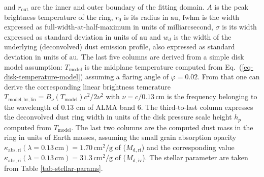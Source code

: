 \documentclass{aa}
\begin{document}
\begin{table*}
{  and $r_{\mathrm{out}}$ are the inner and outer boundary of the fitting domain. $A$ is the
  peak brightness temperature of the ring, $r_0$ is its radius in $\mathrm{au}$,
  $\mathrm{fwhm}$ is the width expressed as full-width-at-half-maximum in units
  of milliarcsecond, $\sigma$ is its width expressed as standard deviation in
  units of $\mathrm{au}$ and $w_d$ is the width of the underlying (deconvolved)
  dust emission profile, also expressed as standard deviation in units of
  $\mathrm{au}$. The last five columns are derived from a simple disk model
  assumption: $T_{\mathrm{model}}$ is the midplane temperature computed from
  Eq.~(\ref{eq-disk-temperature-model}) assuming a flaring angle of
  $\varphi=0.02$. From that one can derive the corresponding linear brightness
  temerature $T_{\mathrm{model,br,lin}}=B_\nu(T_{\mathrm{model}})c^2/2\nu^2$ with
  $\nu=c/0.13\,\mathrm{cm}$ is the frequency belonging to the wavelength of
  0.13 $\mathrm{cm}$ of ALMA band 6.
  The third-to-last column expresses the deconvolved dust ring
  width in units of the disk pressure scale height $h_p$ computed from
  $T_{\mathrm{model}}$. The last two columns are the computed dust mass in the
  ring in units of Earth masses, assuming the small grain absorption opacity
  $\kappa_{\mathrm{abs,ri}}(\lambda=0.13\,\mathrm{cm})=1.70\,\mathrm{cm}^2/\mathrm{g}$
  of \citet{2010A&A...512A..15R} ($M_{\mathrm{d,ri}}$) and the corresponding
  value
  $\kappa_{\mathrm{abs,ri}}(\lambda=0.13\,\mathrm{cm})=31.3\,\mathrm{cm}^2/\mathrm{g}$
  of \citet{1997MNRAS.291..121I} ($M_{\mathrm{d,iv}}$). The stellar parameter
  are taken from Table \ref{tab-stellar-params}.}
\end{table*}
\end{document}
